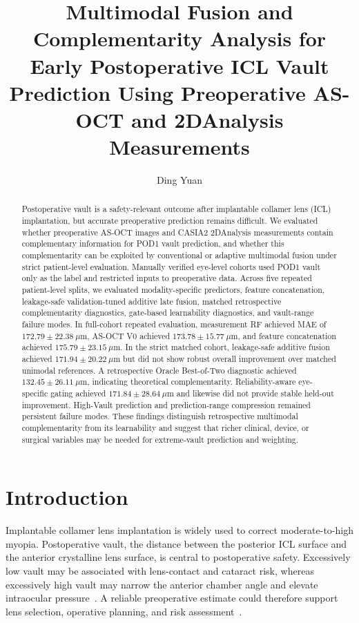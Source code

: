 \documentclass[10pt,twocolumn]{article}
\title{Multimodal Fusion and Complementarity Analysis for Early Postoperative ICL Vault Prediction Using Preoperative AS-OCT and 2DAnalysis Measurements}
\author{Ding Yuan}
\date{}
\begin{document}
\maketitle

\begin{abstract}
Postoperative vault is a safety-relevant outcome after implantable collamer lens (ICL) implantation, but accurate preoperative prediction remains difficult. We evaluated whether preoperative AS-OCT images and CASIA2 2DAnalysis measurements contain complementary information for POD1 vault prediction, and whether this complementarity can be exploited by conventional or adaptive multimodal fusion under strict patient-level evaluation. Manually verified eye-level cohorts used POD1 vault only as the label and restricted inputs to preoperative data. Across five repeated patient-level splits, we evaluated modality-specific predictors, feature concatenation, leakage-safe validation-tuned additive late fusion, matched retrospective complementarity diagnostics, gate-based learnability diagnostics, and vault-range failure modes. In full-cohort repeated evaluation, measurement RF achieved MAE of $172.79 \pm 22.38~\mu$m, AS-OCT V0 achieved $173.78 \pm 15.77~\mu$m, and feature concatenation achieved $175.79 \pm 23.15~\mu$m. In the strict matched cohort, leakage-safe additive fusion achieved $171.94 \pm 20.22~\mu$m but did not show robust overall improvement over matched unimodal references. A retrospective Oracle Best-of-Two diagnostic achieved $132.45 \pm 26.11~\mu$m, indicating theoretical complementarity. Reliability-aware eye-specific gating achieved $171.84 \pm 28.64~\mu$m and likewise did not provide stable held-out improvement. High-Vault prediction and prediction-range compression remained persistent failure modes. These findings distinguish retrospective multimodal complementarity from its learnability and suggest that richer clinical, device, or surgical variables may be needed for extreme-vault prediction and weighting.
\end{abstract}

\section{Introduction}

Implantable collamer lens implantation is widely used to correct moderate-to-high myopia. Postoperative vault, the distance between the posterior ICL surface and the anterior crystalline lens surface, is central to postoperative safety. Excessively low vault may be associated with lens-contact and cataract risk, whereas excessively high vault may narrow the anterior chamber angle and elevate intraocular pressure~\cite{icl_sizing_rule,icl_vault_biometry}. A reliable preoperative estimate could therefore support lens selection, operative planning, and risk assessment~\cite{icl_vault_biometry,nakamura_icl_sizing}.
\end{document}
